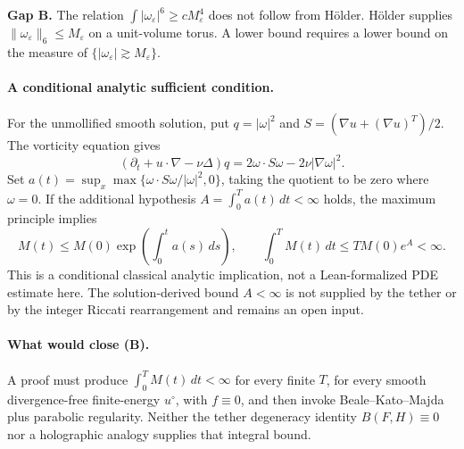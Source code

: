\documentclass{article}
\begin{document}
\textbf{Gap B.} The relation $\int|\omega_\varepsilon|^6\ge c M_\varepsilon^4$ does not follow from H\"older. H\"older supplies $\|\omega_\varepsilon\|_6\le M_\varepsilon$ on a unit-volume torus. A lower bound requires a lower bound on the measure of $\{|\omega_\varepsilon|\gtrsim M_\varepsilon\}$.

\paragraph{A conditional analytic sufficient condition.}
For the unmollified smooth solution, put $q=|\omega|^2$ and
$S=(\nabla u+(\nabla u)^T)/2$. The vorticity equation gives
\[
(\partial_t+u\cdot\nabla-\nu\Delta)q
=2\omega\cdot S\omega-2\nu|\nabla\omega|^2.
\]
Set $a(t)=\sup_x\max\{\omega\cdot S\omega/|\omega|^2,0\}$, taking the
quotient to be zero where $\omega=0$. If the additional hypothesis
$A=\int_0^T a(t)\,dt<\infty$ holds, the maximum principle implies
\[
M(t)\le M(0)\exp\!\left(\int_0^t a(s)\,ds\right),\qquad
\int_0^T M(t)\,dt\le T M(0)e^A<\infty.
\]
This is a conditional classical analytic implication, not a Lean-formalized
PDE estimate here. The solution-derived bound $A<\infty$ is not supplied
by the tether or by the integer Riccati rearrangement and remains an open input.

\paragraph{What would close (B).}
A proof must produce $\int_0^T M(t)\,dt<\infty$ for every finite $T$, for every smooth divergence-free finite-energy $u^\circ$, with $f\equiv 0$, and then invoke Beale--Kato--Majda plus parabolic regularity. Neither the tether degeneracy identity $B(F,H)\equiv 0$ nor a holographic analogy supplies that integral bound.
\end{document}

